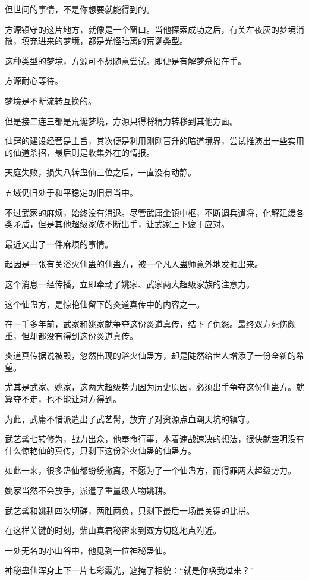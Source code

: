 \begin{this_body}
但世间的事情，不是你想要就能得到的。

方源镇守的这片地方，就像是一个窗口。当他探索成功之后，有关左夜灰的梦境消散，填充进来的梦境，都是光怪陆离的荒诞类型。

这种类型的梦境，方源可不想随意尝试。即便是有解梦杀招在手。

方源耐心等待。

梦境是不断流转互换的。

但是接二连三都是荒诞梦境，方源只得将精力转移到其他方面。

仙窍的建设经营是主旨，其次便是利用刚刚晋升的暗道境界，尝试推演出一些实用的仙道杀招，最后则是收集外在的情报。

天庭失败，损失八转蛊仙三位之后，一直没有动静。

五域仍旧处于和平稳定的旧景当中。

不过武家的麻烦，始终没有消退。尽管武庸坐镇中枢，不断调兵遣将，化解延缓各类矛盾，但是其他超级家族不断出手，让武家上下疲于应对。

最近又出了一件麻烦的事情。

起因是一张有关浴火仙蛊的仙蛊方，被一个凡人蛊师意外地发掘出来。

这个消息一经传播，立即牵动了姚家、武家两大超级家族的注意力。

这个仙蛊方，是惊艳仙留下的炎道真传中的内容之一。

在一千多年前，武家和姚家就争夺这份炎道真传，结下了仇怨。最终双方死伤颇重，但却都没有得到这份炎道真传。

炎道真传据说被毁，忽然出现的浴火仙蛊方，却是陡然给世人增添了一份全新的希望。

尤其是武家、姚家，这两大超级势力因为历史原因，必须出手争夺这份仙蛊方。就算夺不走，也不能让对方得到。

为此，武庸不惜派遣出了武艺髯，放弃了对资源点血潮天坑的镇守。

武艺髯七转修为，战力出众，他奉命行事，本着速战速决的想法，很快就查明没有什么惊艳仙的真传，只剩下这份浴火仙蛊的仙蛊方。

如此一来，很多蛊仙都纷纷撤离，不愿为了一个仙蛊方，而得罪两大超级势力。

姚家当然不会放手，派遣了重量级人物姚耕。

武艺髯和姚耕四次切磋，两胜两负，只剩下最后一场最关键的比拼。

在这样关键的时刻，紫山真君秘密来到双方切磋地点附近。

一处无名的小山谷中，他见到一位神秘蛊仙。

神秘蛊仙浑身上下一片七彩霞光，遮掩了相貌：“就是你唤我过来？”


\end{this_body}
